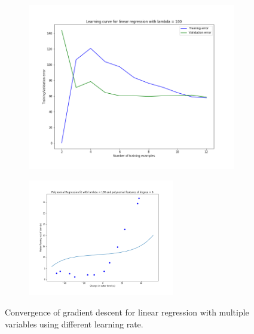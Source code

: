 \documentclass[english,11pt]{article}
\begin{document}
\begin{figure}[H]
\centering
\begin{subfigure}{.5\textwidth}
\centering
\includegraphics[width=.7\linewidth]{../hw1/part2/fig3_2_A4_learning_curve_lambda_100.png}
\end{subfigure}%
\begin{subfigure}{.5\textwidth}
\centering
\includegraphics[width=0.7\textwidth]{../hw1/part2/fig3_2_A4_polynomial_fit_lambda_100.png}
\end{subfigure}

\caption{Convergence of gradient descent for linear regression with multiple variables using different learning rate.}
\label{fig:3_2_A4}
\end{figure}
\end{document}
